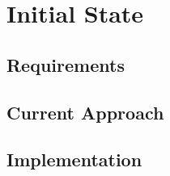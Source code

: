 \chapter{Initial State}
\label{chap:initialState}
\section{Requirements}
\label{sec:requirements}
\section{Current Approach}
\label{sec:currentApproach}
\section{Implementation}
\label{sec:implementation}